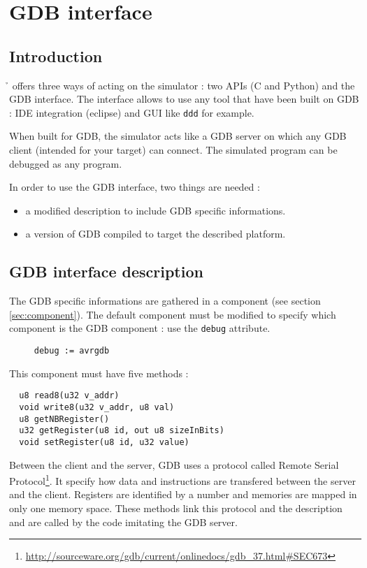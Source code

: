 \chapter{GDB interface}
\section{Introduction}
\h{} offers three ways of acting on the simulator : two APIs (C and Python) and
the GDB interface. The interface allows to use any tool that have been built on
GDB : IDE integration (eclipse) and GUI like {\tt ddd} for example.

When built for GDB, the simulator acts like a GDB server on which any GDB client
(intended for your target) can connect. The simulated program can be debugged as
any program.

In order to use the GDB interface, two things are needed :
\begin{itemize}
	\item a modified description to include GDB specific informations.
	\item a version of GDB compiled to target the described platform.
\end{itemize}

\section{GDB interface description}
The GDB specific informations are gathered in a component (see section
\ref{sec:component}). The default component must be modified to specify
which component is the GDB component : use the {\tt debug} attribute.
\begin{lstlisting}
	 debug := avrgdb
\end{lstlisting}

This component must have five methods :
\begin{lstlisting}
  u8 read8(u32 v_addr)
  void write8(u32 v_addr, u8 val)
  u8 getNBRegister()
  u32 getRegister(u8 id, out u8 sizeInBits)
  void setRegister(u8 id, u32 value)
\end{lstlisting}

Between the client and the server, GDB uses a protocol called Remote Serial
Protocol\footnote{\url{http://sourceware.org/gdb/current/onlinedocs/gdb_37.html\#SEC673}}.
It specify how data and instructions are transfered between the server and the
client. Registers are identified by a number and memories are mapped in only one
memory space. These methods link this protocol and the description and are
called by the code imitating the GDB server.

